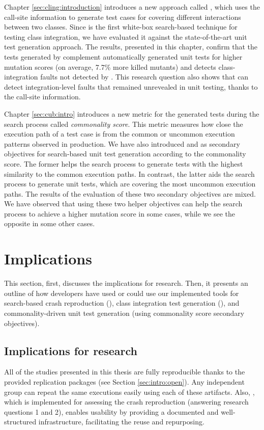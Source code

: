Chapter \ref{sec:cling:introduction} introduces a new approach called \cling, which uses the call-site information to generate test cases for covering different interactions between two classes. Since \cling is the first white-box search-based technique for testing class integration, we have evaluated it against the state-of-the-art unit test generation approach. The results, presented in this chapter, confirm that the tests generated by \cling complement automatically generated unit tests for higher mutation scores (on average, 7.7\% more killed mutants) and detects class-integration faults not detected by \evosuite. This research question also shows that \cling can detect integration-level faults that remained unrevealed in unit testing, thanks to the call-site information.


Chapter \ref{sec:cub:intro} introduces a new metric for the generated tests during the search process called \emph{commonality score}. This metric measures how close the execution path of a test case is from the common or uncommon execution patterns observed in production. We have also introduced \com and \ucom as secondary objectives for search-based unit test generation according to the commonality score. The former helps the search process to generate tests with the highest similarity to the common execution paths. In contrast, the latter aids the search process to generate unit tests, which are covering the most uncommon execution paths. The results of the evaluation of these two secondary objectives are mixed. We have observed that using these two helper objectives can help the search process to achieve a higher mutation score in some cases, while we see the opposite in some other cases.



\section{Implications}

This section, first, discusses the implications for research. Then, it presents an outline of how developers have used or could use our implemented tools for search-based crash reproduction (\botsing), class integration test generation (\cling), and commonality-driven unit test generation (using commonality score secondary objectives).

\subsection{Implications for research}
All of the studies presented in this thesis are fully reproducible thanks to the provided replication packages (see Section \ref{sec:intro:open}). Any independent group can repeat the same executions easily using each of these artifacts.
Also, \exrunner, which is implemented for assessing the crash reproduction (answering research questions 1 and 2), enables usability by providing a documented and well-structured infrastructure, facilitating the reuse and repurposing.



